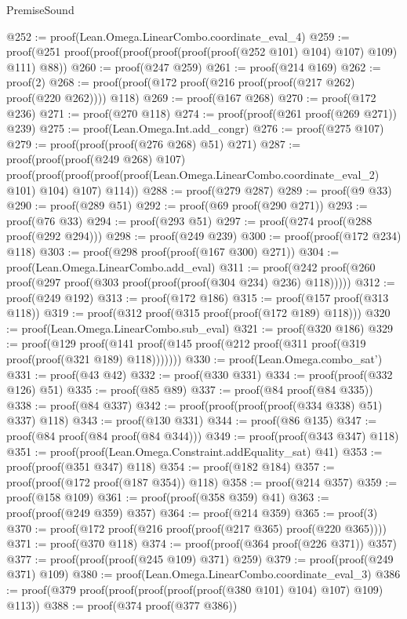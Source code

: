 \begin{lexlean}{PremiseSound}
\begin{coremodule}
@252 := proof(Lean.Omega.LinearCombo.coordinate_eval_4)
@259 := proof(@251 proof(proof(proof(proof(proof(proof(@252 @101) @104) @107) @109) @111) @88))
@260 := proof(@247 @259)
@261 := proof(@214 @169)
@262 := proof(2)
@268 := proof(proof(@172 proof(@216 proof(proof(@217 @262) proof(@220 @262)))) @118)
@269 := proof(@167 @268)
@270 := proof(@172 @236)
@271 := proof(@270 @118)
@274 := proof(proof(@261 proof(@269 @271)) @239)
@275 := proof(Lean.Omega.Int.add_congr)
@276 := proof(@275 @107)
@279 := proof(proof(proof(@276 @268) @51) @271)
@287 := proof(proof(proof(@249 @268) @107)
      proof(proof(proof(proof(proof(Lean.Omega.LinearCombo.coordinate_eval_2) @101) @104) @107)
          @114))
@288 := proof(@279 @287)
@289 := proof(@9 @33)
@290 := proof(@289 @51)
@292 := proof(@69 proof(@290 @271))
@293 := proof(@76 @33)
@294 := proof(@293 @51)
@297 := proof(@274 proof(@288 proof(@292 @294)))
@298 := proof(@249 @239)
@300 := proof(proof(@172 @234) @118)
@303 := proof(@298 proof(proof(@167 @300) @271))
@304 := proof(Lean.Omega.LinearCombo.add_eval)
@311 := proof(@242 proof(@260 proof(@297 proof(@303 proof(proof(proof(@304 @234) @236) @118)))))
@312 := proof(@249 @192)
@313 := proof(@172 @186)
@315 := proof(@157 proof(@313 @118))
@319 := proof(@312 proof(@315 proof(proof(@172 @189) @118)))
@320 := proof(Lean.Omega.LinearCombo.sub_eval)
@321 := proof(@320 @186)
@329 := proof(@129
      proof(@141 proof(@145 proof(@212 proof(@311 proof(@319 proof(proof(@321 @189) @118)))))))
@330 := proof(Lean.Omega.combo_sat')
@331 := proof(@43 @42)
@332 := proof(@330 @331)
@334 := proof(proof(@332 @126) @51)
@335 := proof(@85 @89)
@337 := proof(@84 proof(@84 @335))
@338 := proof(@84 @337)
@342 := proof(proof(proof(proof(@334 @338) @51) @337) @118)
@343 := proof(@130 @331)
@344 := proof(@86 @135)
@347 := proof(@84 proof(@84 proof(@84 @344)))
@349 := proof(proof(@343 @347) @118)
@351 := proof(proof(Lean.Omega.Constraint.addEquality_sat) @41)
@353 := proof(proof(@351 @347) @118)
@354 := proof(@182 @184)
@357 := proof(proof(@172 proof(@187 @354)) @118)
@358 := proof(@214 @357)
@359 := proof(@158 @109)
@361 := proof(proof(@358 @359) @41)
@363 := proof(proof(@249 @359) @357)
@364 := proof(@214 @359)
@365 := proof(3)
@370 := proof(@172 proof(@216 proof(proof(@217 @365) proof(@220 @365))))
@371 := proof(@370 @118)
@374 := proof(proof(@364 proof(@226 @371)) @357)
@377 := proof(proof(proof(@245 @109) @371) @259)
@379 := proof(proof(@249 @371) @109)
@380 := proof(Lean.Omega.LinearCombo.coordinate_eval_3)
@386 := proof(@379 proof(proof(proof(proof(proof(@380 @101) @104) @107) @109) @113))
@388 := proof(@374 proof(@377 @386))

\end{coremodule}
\end{lexlean}
